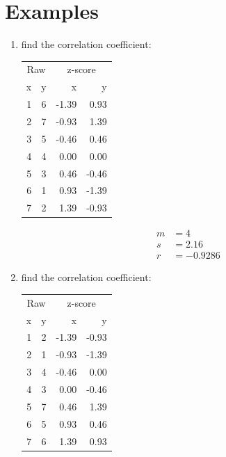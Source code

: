 \documentclass[landscape]{exam}
\begin{document}
  \section{Examples}

  \begin{enumerate}
    \item find the correlation coefficient:
      \begin{table}[H]
      \centering
      \begin{tabular}{rrrr}
        \toprule
        \multicolumn{2}{c}{Raw} & \multicolumn{2}{c}{z-score } \\
        \cmidrule(r){1-2} \cmidrule(r){3-4} 
        x & y & x     & y \\
        \midrule
        1 & 6 & -1.39 & 0.93 \\
        2 & 7 & -0.93 & 1.39 \\
        3 & 5 & -0.46 & 0.46 \\
        4 & 4 & 0.00  & 0.00 \\
        5 & 3 & 0.46  & -0.46 \\
        6 & 1 & 0.93  & -1.39 \\
        7 & 2 & 1.39  & -0.93 \\
        \bottomrule
      \end{tabular}
      \end{table}

    \begin{solution}
      \begin{align*}
        m &= 4 \\
        s &= 2.16 \\
        r &= -0.9286
      \end{align*}
    \end{solution}

    \item find the correlation coefficient:
      \begin{table}[H]
      \centering
      \begin{tabular}{rrrr}
        \toprule
        \multicolumn{2}{c}{Raw} & \multicolumn{2}{c}{z-score } \\
        \cmidrule(r){1-2} \cmidrule(r){3-4} 
        x & y & x     & y \\
        \midrule
        1 & 2 & -1.39 & -0.93 \\ 
        2 & 1 & -0.93 & -1.39 \\ 
        3 & 4 & -0.46 & 0.00 \\ 
        4 & 3 & 0.00 & -0.46 \\ 
        5 & 7 & 0.46 & 1.39 \\ 
        6 & 5 & 0.93 & 0.46 \\ 
        7 & 6 & 1.39 & 0.93 \\ 
        \bottomrule
      \end{tabular}
      \end{table}


\end{enumerate}
\end{document}

